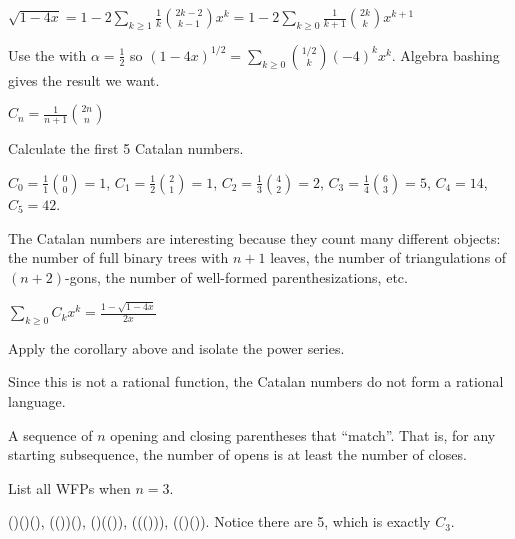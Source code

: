 \begin{corollary}
  $\sqrt{1-4x} = 1-2\sum_{k\geq 1}\frac{1}{k}\binom{2k-2}{k-1}x^k
    = 1-2\sum_{k\geq0}\frac{1}{k+1}\binom{2k}{k}x^{k+1}$
\end{corollary}
\begin{prf}
  Use the  with $\alpha = \frac12$
  so $(1-4x)^{1/2} = \sum_{k \geq 0}\binom{1/2}{k}(-4)^k x^k$.
  Algebra bashing gives the result we want.
\end{prf}

\begin{defn}
  $C_n = \frac{1}{n+1}\binom{2n}{n}$
\end{defn}

\begin{example}
  Calculate the first 5 Catalan numbers.
\end{example}
\begin{sol}
  $C_0 = \frac{1}{1}\binom{0}{0} = 1$,
  $C_1 = \frac{1}{2}\binom{2}{1} = 1$,
  $C_2 = \frac{1}{3}\binom{4}{2} = 2$,
  $C_3 = \frac{1}{4}\binom{6}{3} = 5$,
  $C_4 = 14$, $C_5 = 42$.
\end{sol}

The Catalan numbers are interesting because they count many different objects:
the number of full binary trees with $n+1$ leaves,
the number of triangulations of $(n+2)$-gons,
the number of well-formed parenthesizations,
etc.

\begin{prop}
  $\sum_{k \geq 0} C_k x^k = \frac{1-\sqrt{1-4x}}{2x}$
\end{prop}
\begin{prf}
  Apply the corollary above and isolate the power series.
\end{prf}

Since this is not a rational function, the Catalan numbers do not form a rational language.

\begin{defn}
  A sequence of $n$ opening and closing parentheses that ``match''.
  That is, for any starting subsequence, the number of opens
  is at least the number of closes.
\end{defn}
\begin{example}
  List all WFPs when $n=3$.
\end{example}
\begin{sol}
  ()()(), (())(), ()(()), ((())), (()()).
  Notice there are 5, which is exactly $C_3$.
\end{sol}

